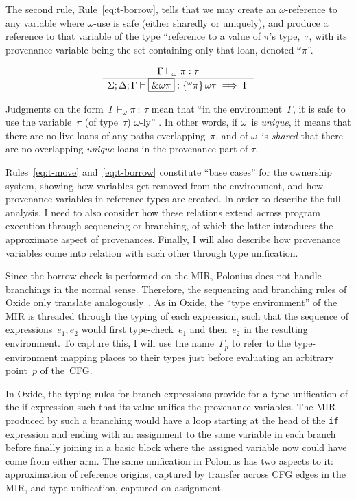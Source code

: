 \documentclass[11pt,a4paper,twoside,openany]{report}
\newcommand{\InRust}[1]{\texttt{#1}}
\newcommand{\expression}[1]{\boxed{#1}}
\newcommand{\ntyperule}[2]{\begin{array}{c}#1\\\hline\raisebox{1pt}{\strut}#2\end{array}}
\begin{document}
  The second rule, Rule~\eqref{eq:t-borrow}, tells that we may create an
  $\omega$-reference to any variable where $\omega$-use is safe (either sharedly
  or uniquely), and produce a reference to that variable of the type ``reference
  to a value of $\pi$'s type,~$\tau$, with its provenance variable being the set
  containing only that loan, denoted $^{\omega}\pi$''.

\begin{equation}\label{eq:t-borrow}
  \ntyperule{\Gamma \vdash_{\omega} \pi : \tau}
  {\Sigma ; \Delta ; \Gamma \vdash \expression{\&\omega \pi} : \left \{ ^{\omega}\pi\right \} \omega \tau \implies \Gamma}
\end{equation}

Judgments on the form~$\Gamma \vdash_{\omega} \pi \: : \: \tau$ mean that ``in
the environment~$\Gamma$, it is safe to use the variable~$\pi$ (of type~$\tau$)
$\omega$-ly'' \cite{weiss_oxide:_2019}. In other words, if $\omega$~is
\emph{unique}, it means that there are no live loans of any paths
overlapping~$\pi$, and of $\omega$~is \emph{shared} that there are no
overlapping \emph{unique} loans in the provenance part of $\tau$.

Rules~\eqref{eq:t-move} and~\eqref{eq:t-borrow} constitute ``base cases'' for
the ownership system, showing how variables get removed from the environment,
and how provenance variables in reference types are created. In order to
describe the full analysis, I need to also consider how these relations extend
across program execution through sequencing or branching, of which the latter
introduces the approximate aspect of provenances. Finally, I will also describe
how provenance variables come into relation with each other through type
unification.

Since the borrow check is performed on the MIR, Polonius does not handle
branchings in the normal sense. Therefore, the sequencing and branching rules of
Oxide only translate analogously~\cite{weiss_oxide:_2019}. As in Oxide, the
``type environment'' of the MIR is threaded through the typing of each
expression, such that the sequence of expressions~$\expression{e_1; e_2}$ would
first type-check~$e_1$ and then~$e_2$ in the resulting environment. To capture
this, I will use the name~$\Gamma_p$ to refer to the type-environment mapping
places to their types just before evaluating an arbitrary point~$p$ of the~CFG.

In Oxide, the typing rules for branch expressions provide for a type unification
of the if expression such that its value unifies the provenance variables. The
MIR produced by such a branching would have a loop starting at the head of the
\InRust{if} expression and ending with an assignment to the same variable in
each branch before finally joining in a basic block where the assigned variable
now could have come from either arm. The same unification in Polonius has two
aspects to it: approximation of reference origins, captured by transfer across
CFG edges in the MIR, and type unification, captured on assignment.
\end{document}
